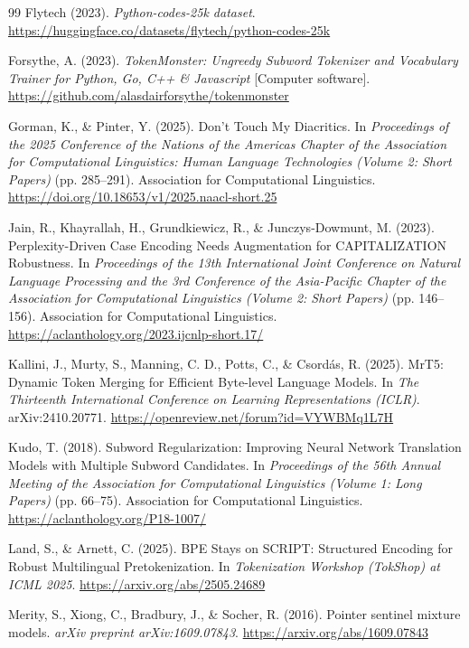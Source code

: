 \documentclass{article}
\begin{document}
\begin{thebibliography}{99}
Flytech (2023). \emph{Python-codes-25k dataset}. \url{https://huggingface.co/datasets/flytech/python-codes-25k}

Forsythe, A. (2023). \emph{TokenMonster: Ungreedy Subword Tokenizer and
Vocabulary Trainer for Python, Go, C++ \& Javascript} [Computer software].
\url{https://github.com/alasdairforsythe/tokenmonster}

Gorman, K., \& Pinter, Y. (2025). Don't Touch My Diacritics. In \emph{Proceedings of the 2025 Conference of the Nations of the Americas Chapter of the Association for Computational Linguistics: Human Language Technologies (Volume 2: Short Papers)} (pp. 285--291). Association for Computational Linguistics. \url{https://doi.org/10.18653/v1/2025.naacl-short.25}

Jain, R., Khayrallah, H., Grundkiewicz, R., \& Junczys-Dowmunt, M. (2023). Perplexity-Driven Case Encoding Needs Augmentation for CAPITALIZATION Robustness. In \emph{Proceedings of the 13th International Joint Conference on Natural Language Processing and the 3rd Conference of the Asia-Pacific Chapter of the Association for Computational Linguistics (Volume 2: Short Papers)} (pp. 146--156). Association for Computational Linguistics. \url{https://aclanthology.org/2023.ijcnlp-short.17/}

Kallini, J., Murty, S., Manning, C. D., Potts, C., \& Csord{\'a}s, R. (2025). MrT5: Dynamic Token Merging for Efficient Byte-level Language Models. In \emph{The Thirteenth International Conference on Learning Representations (ICLR)}. arXiv:2410.20771. \url{https://openreview.net/forum?id=VYWBMq1L7H}

Kudo, T. (2018). Subword Regularization: Improving Neural Network Translation Models with Multiple Subword Candidates. In \emph{Proceedings of the 56th Annual Meeting of the Association for Computational Linguistics (Volume 1: Long Papers)} (pp. 66--75). Association for Computational Linguistics. \url{https://aclanthology.org/P18-1007/}

Land, S., \& Arnett, C. (2025). BPE Stays on SCRIPT: Structured Encoding for Robust Multilingual Pretokenization. In \emph{Tokenization Workshop (TokShop) at ICML 2025}. \url{https://arxiv.org/abs/2505.24689}

Merity, S., Xiong, C., Bradbury, J., \& Socher, R. (2016). Pointer sentinel mixture models. \emph{arXiv preprint arXiv:1609.07843}. \url{https://arxiv.org/abs/1609.07843}


\end{thebibliography}
\end{document}
